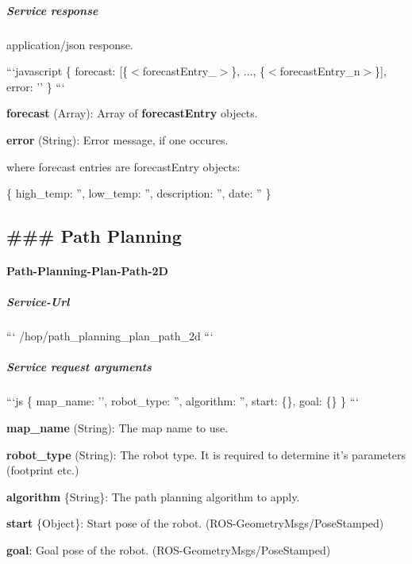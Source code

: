 \subparagraph*{Service response}

application/json response.

```javascript \{ forecast\-: \mbox{[}\{$<$forecast\-Entry\-\_$>$\}, ..., \{$<$forecast\-Entry\-\_\-n$>$\}\mbox{]}, error\-: '' \} ```


\begin{DoxyItemize}
\item {\bfseries forecast} (Array)\-: Array of {\bfseries forecast\-Entry} objects.
\item {\bfseries error} (String)\-: Error message, if one occures.
\end{DoxyItemize}

where forecast entries are forecast\-Entry objects\-:

\{ high\-\_\-temp\-: '', low\-\_\-temp\-: '', description\-: '', date\-: '' \}



 \subsection*{\#\#\# Path Planning }

\paragraph*{Path-\/\-Planning-\/\-Plan-\/\-Path-\/2\-D}

\subparagraph*{Service-\/\-Url}

``` /hop/path\-\_\-planning\-\_\-plan\-\_\-path\-\_\-2d ```

\subparagraph*{Service request arguments}

```js \{ map\-\_\-name\-: '', robot\-\_\-type\-: '', algorithm\-: '', start\-: \{\}, goal\-: \{\} \} ```


\begin{DoxyItemize}
\item {\bfseries map\-\_\-name} (String)\-: The map name to use.
\item {\bfseries robot\-\_\-type} (String)\-: The robot type. It is required to determine it's parameters (footprint etc.)
\item {\bfseries algorithm} \{String\}\-: The path planning algorithm to apply.
\item {\bfseries start} \{Object\}\-: Start pose of the robot. (R\-O\-S-\/\-Geometry\-Msgs/\-Pose\-Stamped)
\item {\bfseries goal}\-: Goal pose of the robot. (R\-O\-S-\/\-Geometry\-Msgs/\-Pose\-Stamped)
\end{DoxyItemize}


